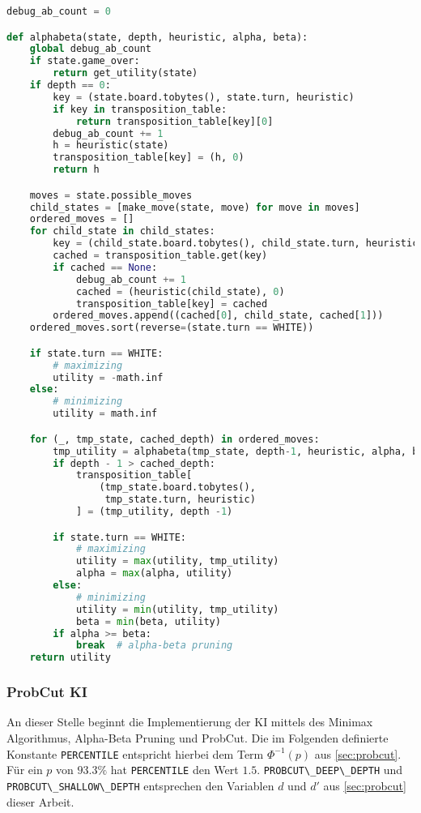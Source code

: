 \begin{lstlisting}[language=Python]
debug_ab_count = 0

def alphabeta(state, depth, heuristic, alpha, beta):
    global debug_ab_count
    if state.game_over:
        return get_utility(state)
    if depth == 0:
        key = (state.board.tobytes(), state.turn, heuristic)
        if key in transposition_table:
            return transposition_table[key][0]
        debug_ab_count += 1
        h = heuristic(state)
        transposition_table[key] = (h, 0)
        return h

    moves = state.possible_moves
    child_states = [make_move(state, move) for move in moves]
    ordered_moves = []
    for child_state in child_states:
        key = (child_state.board.tobytes(), child_state.turn, heuristic)
        cached = transposition_table.get(key)
        if cached == None:
            debug_ab_count += 1
            cached = (heuristic(child_state), 0)
            transposition_table[key] = cached
        ordered_moves.append((cached[0], child_state, cached[1]))
    ordered_moves.sort(reverse=(state.turn == WHITE))

    if state.turn == WHITE:
        # maximizing
        utility = -math.inf
    else:
        # minimizing
        utility = math.inf

    for (_, tmp_state, cached_depth) in ordered_moves:
        tmp_utility = alphabeta(tmp_state, depth-1, heuristic, alpha, beta)
        if depth - 1 > cached_depth:
            transposition_table[
                (tmp_state.board.tobytes(),
                 tmp_state.turn, heuristic)
            ] = (tmp_utility, depth -1)

        if state.turn == WHITE:
            # maximizing
            utility = max(utility, tmp_utility)
            alpha = max(alpha, utility)
        else:
            # minimizing
            utility = min(utility, tmp_utility)
            beta = min(beta, utility)
        if alpha >= beta:
            break  # alpha-beta pruning
    return utility
\end{lstlisting}

\hypertarget{probcut-ki}{%
\subsubsection{ProbCut KI}\label{probcut-ki}}

An dieser Stelle beginnt die Implementierung der \ac{KI} mittels des
Minimax Algorithmus, Alpha-Beta Pruning und ProbCut. Die im Folgenden
definierte Konstante \passthrough{\lstinline!PERCENTILE!} entspricht
hierbei dem Term \(\Phi^{-1}(p)\) aus \autoref{sec:probcut}. Für ein
\(p\) von \(93.3\%\) hat \passthrough{\lstinline!PERCENTILE!} den Wert
\(1.5\). \passthrough{\lstinline!PROBCUT\_DEEP\_DEPTH!} und
\passthrough{\lstinline!PROBCUT\_SHALLOW\_DEPTH!} entsprechen den
Variablen \(d\) und \(d'\) aus \autoref{sec:probcut} dieser Arbeit.

